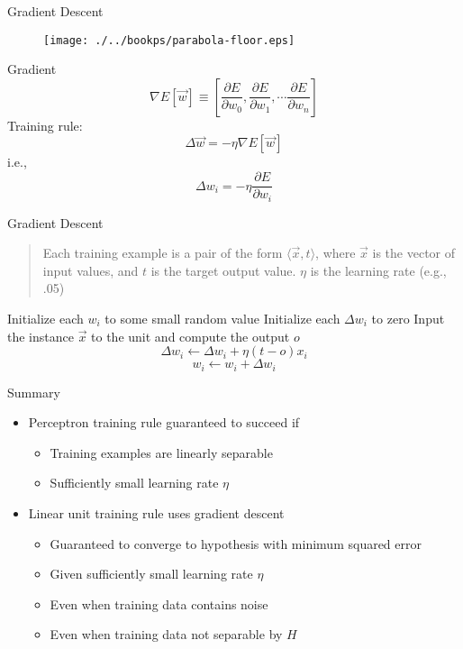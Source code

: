 \documentclass[%
pdf,
colorBG,
slideColor,
tcrico,
]{prosper}
\begin{document}
\begin{slide}{  Gradient Descent  } 
\begin{figure}
	\centering
	\texttt{[image: ./../bookps/parabola-floor.eps]}
\end{figure}
\tiny
Gradient
\[ \nabla E[\vec{w}] \equiv \left[\frac{\partial E}{\partial w_{0}},
\frac{\partial E}{\partial w_{1}}, \cdots \frac{\partial E}{\partial
w_{n}}\right] \]
Training rule:
\[\Delta \vec{w} = -\eta \nabla E[\vec{w}] \]
i.e.,
\[\Delta w_{i} = -\eta  \frac{\partial E}{\partial w_{i}}\]
\end{slide}


\begin{slide}{ Gradient Descent  } 
\tiny
 \begin{quote}
 Each training example is a pair of the form $\langle \vec{x}, t \rangle$, where $\vec{x}$ is the vector of input values, and $t$ is the target output value.  $\eta$ is the learning rate (e.g., .05)
\end{quote}

\begin{algorithm}[H]
Initialize each $w_{i}$ to some small random value \;
{
	Initialize each $\Delta w_{i}$ to zero \;
	{
	Input the instance $\vec{x}$ to the unit and compute the output $o$ \;
	{
		\[ \Delta w_{i} \leftarrow \Delta w_{i} + \eta (t - o) x_{i}  \] 
	}
	}
	{
		\[w_{i} \leftarrow w_{i} + \Delta w_{i}\] 
	}
}
\end{algorithm}
\end{slide} 


\begin{slide}{ Summary } 
\begin{itemize}
 \item Perceptron training rule guaranteed to succeed if
	\begin{itemize}
	\item Training examples are linearly separable
	\item Sufficiently small learning rate $\eta$
	\end{itemize}
\item  Linear unit training rule uses gradient descent
	\begin{itemize}
	\item Guaranteed to converge to hypothesis with minimum squared error
	\item Given sufficiently small learning rate $\eta$
	\item Even when training data contains noise
	\item Even when training data not separable by $H$
	\end{itemize}
\end{itemize}
\end{slide}
\end{document}
